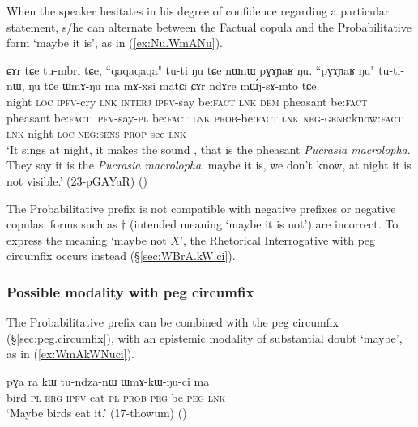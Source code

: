 When the speaker hesitates in his degree of confidence regarding a particular statement, s/he can alternate between the Factual copula  and the Probabilitative form  `maybe it is', as in (\ref{ex:Nu.WmANu}).

 
 \begin{exe}
 \ex \label{ex:Nu.WmANu}
\gll ɕɤr tɕe tu-mbri tɕe, ``qaqaqaqa" tu-ti ŋu tɕe nɯnɯ pɣɤɲaʁ ŋu. ``pɣɤɲaʁ ŋu" tu-ti-nɯ, ŋu tɕe ɯmɤ-ŋu ma mɤ-xsi matɕi ɕɤr ndɤre mɯ́j-sɤ-mto tɕe. \\
night \textsc{loc} \textsc{ipfv}-cry \textsc{lnk} \textsc{interj} \textsc{ipfv}-say be:\textsc{fact} \textsc{lnk} \textsc{dem} pheasant be:\textsc{fact} pheasant be:\textsc{fact} \textsc{ipfv}-say-\textsc{pl} be:\textsc{fact} \textsc{lnk} \textsc{prob}-be:\textsc{fact} \textsc{lnk} \textsc{neg}-\textsc{genr}:know:\textsc{fact} \textsc{lnk} night \textsc{loc} \textsc{neg}:\textsc{sens}-\textsc{prop}-see \textsc{lnk} \\
\glt `It sings at night, it makes the sound , that is the pheasant \textit{Pucrasia macrolopha}. They say it is the \textit{Pucrasia macrolopha}, maybe it is, we don't know, at night it is not visible.' (23-pGAYaR)
()
 \end{exe}
 
The Probabilitative prefix is not compatible with negative prefixes or negative copulas: forms such as $\dagger$ (intended meaning `maybe it is not') are incorrect. To express the meaning `maybe not $X$', the Rhetorical Interrogative  with peg circumfix occurs instead (§\ref{sec:WBrA.kW.ci}).
 
\subsubsection{Possible modality with peg circumfix} \label{sec:WmA.kW.ci}
The Probabilitative prefix can be combined with the peg circumfix (§\ref{sec:peg.circumfix}), with an epistemic modality of substantial doubt  `maybe', as in (\ref{ex:WmAkWNuci}).

\begin{exe}
\ex \label{ex:WmAkWNuci}
\gll pɣa ra kɯ tu-ndza-nɯ ɯmɤ-kɯ-ŋu-ci ma \\
bird \textsc{pl} \textsc{erg} \textsc{ipfv}-eat-\textsc{pl}  \textsc{prob}-\textsc{peg}-be-\textsc{peg} \textsc{lnk} \\
\glt `Maybe birds eat it.' (17-thowum) ()
\end{exe}

